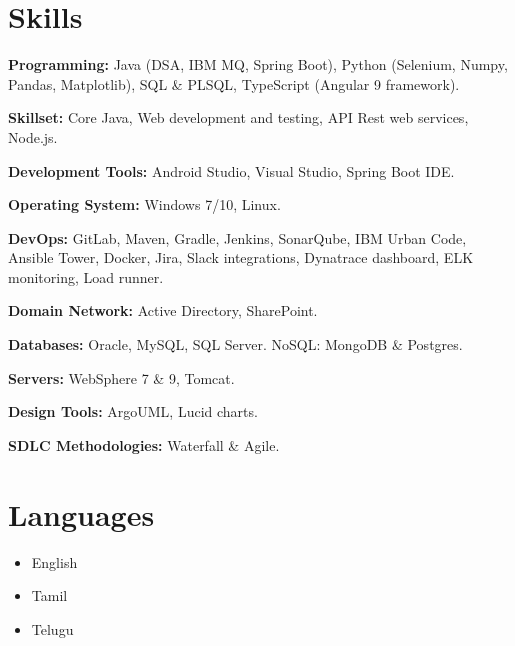 \documentclass[letterpaper,10pt]{article}
\begin{document}
\section*{Skills}

\textbf{Programming:} Java (DSA, IBM MQ, Spring Boot), Python (Selenium, Numpy, Pandas, Matplotlib), SQL \& PLSQL, TypeScript (Angular 9 framework).

\textbf{Skillset:} Core Java, Web development and testing, API Rest web services, Node.js.

\textbf{Development Tools:} Android Studio, Visual Studio, Spring Boot IDE.

\textbf{Operating System:} Windows 7/10, Linux.

\textbf{DevOps:} GitLab, Maven, Gradle, Jenkins, SonarQube, IBM Urban Code, Ansible Tower, Docker, Jira, Slack integrations, Dynatrace dashboard, ELK monitoring, Load runner.

\textbf{Domain Network:} Active Directory, SharePoint.

\textbf{Databases:} Oracle, MySQL, SQL Server. NoSQL: MongoDB \& Postgres.

\textbf{Servers:} WebSphere 7 \& 9, Tomcat.

\textbf{Design Tools:} ArgoUML, Lucid charts.

\textbf{SDLC Methodologies:} Waterfall \& Agile.





\section*{Languages}

\begin{itemize}
    \item English
    \item Tamil
    \item Telugu
\end{itemize}
\end{document}
